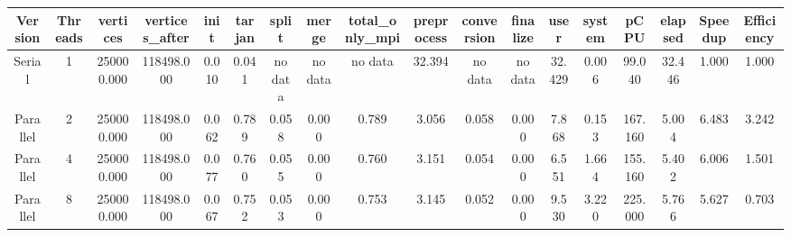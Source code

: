 \begin{tabular}{|c|c|c|c|c|c|c|c|c|c|c|c|c|c|c|c|c|c|}
\toprule
 Version &  Threads &   vertices &  vertices\_after &  init &  tarjan &   split &   merge & total\_only\_mpi &  preprocess & conversion & finalize &   user &  system &    pCPU &  elapsed &  Speedup &  Efficiency \\
\midrule
  Serial &        1 & 250000.000 &      118498.000 & 0.010 &   0.041 & no data & no data &        no data &      32.394 &    no data &  no data & 32.429 &   0.006 &  99.040 &   32.446 &    1.000 &       1.000 \\
Parallel &        2 & 250000.000 &      118498.000 & 0.062 &   0.789 &   0.058 &   0.000 &          0.789 &       3.056 &      0.058 &    0.000 &  7.868 &   0.153 & 167.160 &    5.004 &    6.483 &       3.242 \\
Parallel &        4 & 250000.000 &      118498.000 & 0.077 &   0.760 &   0.055 &   0.000 &          0.760 &       3.151 &      0.054 &    0.000 &  6.551 &   1.664 & 155.160 &    5.402 &    6.006 &       1.501 \\
Parallel &        8 & 250000.000 &      118498.000 & 0.067 &   0.752 &   0.053 &   0.000 &          0.753 &       3.145 &      0.052 &    0.000 &  9.530 &   3.220 & 225.000 &    5.766 &    5.627 &       0.703 \\
\bottomrule
\end{tabular}
